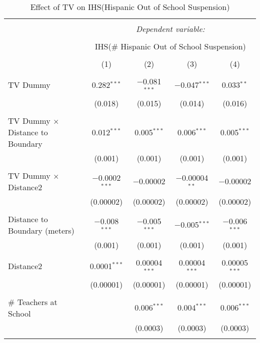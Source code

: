 
\begin{table}[!htbp] \centering 
  \caption{Effect of TV on IHS(Hispanic Out of School Suspension)} 
  \label{} 
\begin{tabular}{@{\extracolsep{-2pt}}lcccc} 
\\[-1.8ex]\hline 
\hline \\[-1.8ex] 
 & \multicolumn{4}{c}{\textit{Dependent variable:}} \\ 
\cline{2-5} 
\\[-1.8ex] & \multicolumn{4}{c}{IHS(\# Hispanic Out of School Suspension)} \\ 
\\[-1.8ex] & (1) & (2) & (3) & (4)\\ 
\hline \\[-1.8ex] 
 TV Dummy & 0.282$^{***}$ & $-$0.081$^{***}$ & $-$0.047$^{***}$ & 0.033$^{**}$ \\ 
  & (0.018) & (0.015) & (0.014) & (0.016) \\ 
  & & & & \\ 
 TV Dummy $\times$ Distance to Boundary & 0.012$^{***}$ & 0.005$^{***}$ & 0.006$^{***}$ & 0.005$^{***}$ \\ 
  & (0.001) & (0.001) & (0.001) & (0.001) \\ 
  & & & & \\ 
 TV Dummy $\times$ Distance2 & $-$0.0002$^{***}$ & $-$0.00002 & $-$0.00004$^{**}$ & $-$0.00002 \\ 
  & (0.00002) & (0.00002) & (0.00002) & (0.00002) \\ 
  & & & & \\ 
 Distance to Boundary (meters) & $-$0.008$^{***}$ & $-$0.005$^{***}$ & $-$0.005$^{***}$ & $-$0.006$^{***}$ \\ 
  & (0.001) & (0.001) & (0.001) & (0.001) \\ 
  & & & & \\ 
 Distance2 & 0.0001$^{***}$ & 0.00004$^{***}$ & 0.00004$^{***}$ & 0.00005$^{***}$ \\ 
  & (0.00001) & (0.00001) & (0.00001) & (0.00001) \\ 
  & & & & \\ 
 \# Teachers at School &  & 0.006$^{***}$ & 0.004$^{***}$ & 0.006$^{***}$ \\ 
  &  & (0.0003) & (0.0003) & (0.0003) \\ 
  & & & & \\ 

\end{tabular}
\end{table}
